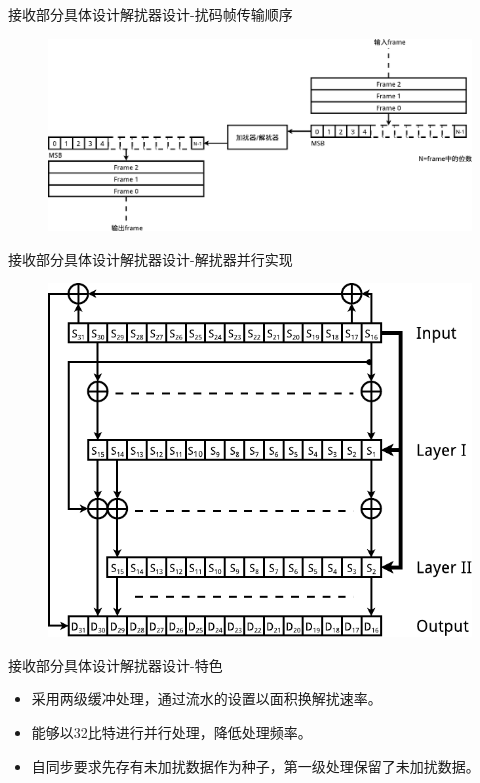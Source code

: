 \documentclass{beamer}
\begin{document}
\begin{frame}{接收部分具体设计}{解扰器设计-扰码帧传输顺序}
  \begin{figure}
  \centering
  \includegraphics[scale=0.6]{./img/serial_scrambling.pdf}
  \end{figure}
\end{frame}

\begin{frame}{接收部分具体设计}{解扰器设计-解扰器并行实现}
  \begin{figure}
  \centering
  \includegraphics[scale=0.5]{./img/scrambler_descrambler_parallel_implementation.pdf}
  \end{figure}
\end{frame}

\begin{frame}{接收部分具体设计}{解扰器设计-特色}
	\begin{itemize}
	\item 采用两级缓冲处理，通过流水的设置以面积换解扰速率。
	\item 能够以32比特进行并行处理，降低处理频率。
	\item 自同步要求先存有未加扰数据作为种子，第一级处理保留了未加扰数据。
	\end{itemize}
\end{frame}
\end{document}
